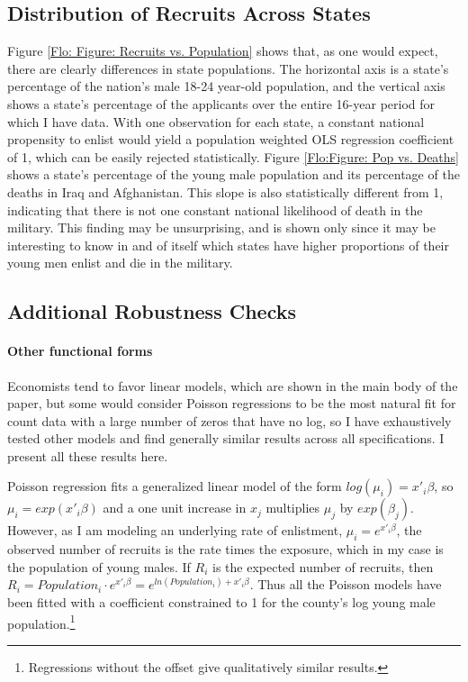 \documentclass[12pt] {article}
\begin{document}
\subsection{Distribution of Recruits Across States}
Figure \ref{Flo: Figure: Recruits vs. Population}
shows that, as one would expect, there are clearly differences in
state populations. The horizontal axis is a state's percentage of
the nation's male 18-24 year-old population, and the vertical axis
shows a state's percentage of the applicants over the entire 16-year
period for which I have data. With one observation for each state,
a constant national propensity to enlist would yield a population
weighted OLS regression coefficient of 1, which can be easily rejected
statistically. Figure \ref{Flo:Figure: Pop vs. Deaths} shows a state's
percentage of the young male population and its percentage of the
deaths in Iraq and Afghanistan. This slope is also statistically different
from 1, indicating that there is not one constant national likelihood
of death in the military. This finding may be unsurprising, and is
shown only since it may be interesting to know in and of itself which
states have higher proportions of their young men enlist and die in
the military. 

\subsection {Additional Robustness Checks}
\paragraph{Other functional forms}
Economists tend to favor linear models, which are shown in the main body of the paper, but some would consider Poisson regressions to be the most natural fit for count data with a large number of zeros that have no log, so I have exhaustively tested other models and find generally similar results across all specifications. I present all these results here. 

Poisson regression fits a generalized linear model of the form $log(\mu_{i})=x'_{i}\beta$, so $\mu_{i}=exp(x'_{i}\beta)$ and a one unit increase in $x_{j}$ multiplies $\mu_{j}$ by $exp(\beta_{j})$. However, as I am modeling an underlying rate of enlistment, $\mu_{i}=e^{x'_{i}\beta}$, the observed number of recruits is the rate times the exposure, which in my case is the population of young males. If $R_{i}$ is the expected number of recruits, then $R_{i}=Population_{i}\cdot e^{x'_{i}\beta}=e^{ln(Population_{i})+x'_{i}\beta}$.
Thus all the Poisson models have been fitted with a coefficient constrained
to 1 for the county's log young male population.\footnote{Regressions without the offset give qualitatively similar results.} 
\end{document}
